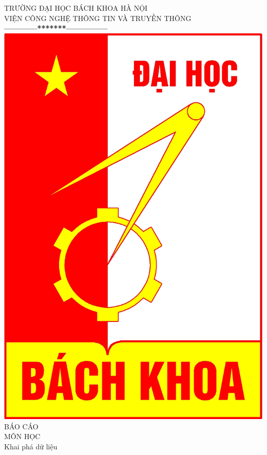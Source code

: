 \documentclass[a4paper,12pt]{report}
\begin{document}
\thispagestyle{empty}
\thisfancypage{
\setlength{\fboxrule}{1pt}
\doublebox}{}

\begin{center}
{\fontsize{16}{19}\selectfont TRƯỜNG ĐẠI HỌC BÁCH KHOA HÀ NỘI\\
VIỆN CÔNG NGHỆ THÔNG TIN VÀ TRUYỀN THÔNG}\\
\textbf{------------*******---------------}\\[1cm]
\includegraphics[scale=0.13]{hust.jpg}\\[1.3cm]
{\fontsize{32}{43}\selectfont BÁO CÁO}\\[0.1cm]
{\fontsize{38}{45}\selectfont MÔN HỌC}\\[0.2cm]
{\fontsize{20}{24}\selectfont Khai phá dữ liệu}\\[0.3cm]

\end{center}
\end{document}
